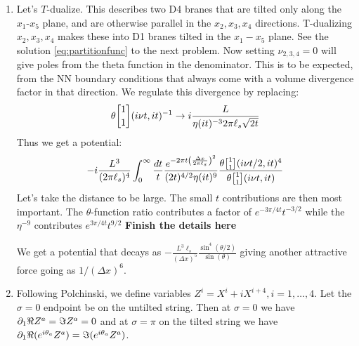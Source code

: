 \documentclass[11pt, class=article, crop=false]{standalone}
\begin{document}
\begin{enumerate}
	\item Let's $T$-dualize. This describes two D4 branes that are tilted only along the $x_1$-$x_5$ plane, and are otherwise parallel in the $x_2, x_3, x_4$ directions. T-dualizing $x_2, x_3, x_4$ makes these into D1 branes tilted in the $x_1 - x_5$ plane. See the solution \eqref{eq:partitionfunc} to the next problem. Now setting $\nu_{2,3,4} = 0$ will give poles from the theta function in the denominator. This is to be expected, from the NN boundary conditions that always come with a volume divergence factor in that direction. We regulate this divergence by replacing:
	\[
		\theta\twist11 (i \nu t, i t)^{-1} \to i \frac{L}{\eta(i t)^{-3} 2 \pi \ell_s \sqrt{2 t}}
	\]
	Thus we get a potential:
	\[
		-i\frac{L^3}{(2 \pi \ell_s)^4}\int_0^\infty \frac{dt}{t} \frac{e^{-2 \pi t \left( \frac{\Delta x}{2\pi \ell_s} \right)^2}}{(2t)^{4/2} \eta(it)^9} \frac{\theta \twist11 (i \nu t/2, i t)^4}{\theta \twist11 (i \nu t, it)}
	\]
	Let's take the distance to be large. The small $t$ contributions are then most important. The $\theta$-function ratio contributes a factor of $e^{-3 \pi /4 t} t^{-3/2}$ while the $\eta^{-9}$ contributes $e^{3 \pi /4 t} t^{9/2}$ \textbf{Finish the details here}
	
	 We get a potential that decays as $-\frac{L^3 \ell_s}{(\Delta x)^5} \frac{\sin^4 (\theta/2)}{\sin(\theta)}$ giving another attractive force going as $1/(\Delta x)^6$. 
	
	\item Following Polchinski, we define variables $Z^i = X^i + i X^{i+4}, i= 1, \dots, 4$. Let the $\sigma = 0$ endpoint be on the untilted string. Then at $\sigma = 0$ we have $\partial_1 \Re Z^a = \Im Z^a = 0$ and at $\sigma = \pi$ on the tilted string we have $\partial_1 \Re(e^{i \theta_a} Z^a) = \Im(e^{i \theta_a} Z^a)$. 
	

\end{enumerate}
\end{document}
